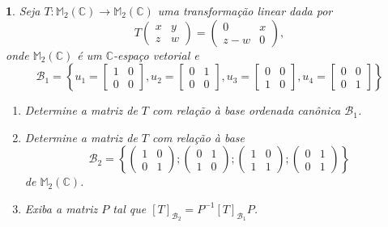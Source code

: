 \documentclass[12pt]{exam}
\newtheorem{exercicio}{}
\newcommand{\complex}{\mathbb{C}}
\newcommand{\cp}[1]{\mathbb{#1}}
\begin{document}
\begin{exercicio}
  Seja $T : \cp{M}_2(\complex) \to \cp{M}_2(\complex)$ uma transforma\c{c}\~ao linear dada por
  \[
    T \begin{pmatrix}
      x & y\\
      z & w
    \end{pmatrix} = \begin{pmatrix}
      0 & x\\
      z - w & 0
    \end{pmatrix},
  \]
  onde $\cp{M}_2(\complex)$ \'e um $\complex$-espa\c{c}o vetorial
  e
  \[
      \mathcal{B}_1 = \left\{u_1 = \begin{bmatrix}
        1 & 0\\0 & 0
      \end{bmatrix}, u_2 = \begin{bmatrix}
        0 & 1\\0 & 0
      \end{bmatrix}, u_3 = \begin{bmatrix}
        0 & 0\\1 & 0
      \end{bmatrix}, u_4 = \begin{bmatrix}
        0 & 0\\0 & 1
      \end{bmatrix}\right\}
  \]
    \begin{enumerate}[label=({\alph*})]
      \item Determine a matriz de $T$ com rela\c{c}\~ao \`a base ordenada can\^onica $\mathcal{B}_1$.
      \item Determine a matriz de $T$ com rela\c{c}\~ao \`a base
      \[
        \mathcal{B}_2 = \left\{\begin{pmatrix}
          1 & 0\\
          0 & 1
        \end{pmatrix}; \begin{pmatrix}
          0 & 1\\
          1 & 0
        \end{pmatrix}; \begin{pmatrix}
          1 & 0\\
          1 & 1
        \end{pmatrix}; \begin{pmatrix}
          0 & 1\\
          0 & 1
        \end{pmatrix}\right\}
      \]
      de $\cp{M}_2(\complex)$.
      \item Exiba a matriz $P$ tal que $[T]_{\mathcal{B}_2} = P^{-1}[T]_{\mathcal{B}_1}P$.

\end{enumerate}
\end{exercicio}
\end{document}
